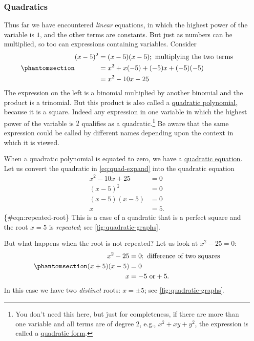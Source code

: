 \documentclass[
  a4paper,
]{article}
\begin{document}
\subsubsection{Quadratics}\label{quadratics}

Thus far we have encountered \emph{linear} equations, in which the
highest power of the variable is \(1\), and the other terms are
constants. But just as numbers can be multiplied, so too can expressions
containing variables. Consider
\begin{equation}\phantomsection\label{eq:quad-expand}{
\begin{aligned}
(x - 5)^{2} &= (x - 5)(x - 5); \text{ multiplying the two terms}\\
&= x^2 +x(-5) + (-5)x + (-5)(-5)\\
&= x^2 - 10x + 25
\end{aligned}
}\end{equation} The expression on the left is a binomial multiplied by
another binomial and the product is a trinomial. But this product is
also called a \href{https://en.wikipedia.org/wiki/Quadratic}{quadratic
polynomial}, because it is a square. Indeed any expression in one
variable in which the highest power of the variable is \(2\) qualifies
as a quadratic.\footnote{You don't need this here, but just for
  completeness, if there are more than one variable and all terms are of
  degree \(2\), e.g., \(x^2 + xy + y^2\), the expression is called a
  \href{https://en.wikipedia.org/wiki/Quadratic_form}{quadratic form}.}
Be aware that the same expression could be called by different names
depending upon the context in which it is viewed.

When a quadratic polynomial is equated to zero, we have a
\href{https://en.wikipedia.org/wiki/Quadratic_equation}{quadratic
equation}. Let us convert the quadratic in \cref{eq:quad-expand} into
the quadratic equation \[
\begin{aligned}
x^2 -10x + 25 &= 0\\
(x - 5)^2 &= 0\\
(x - 5)(x - 5) &= 0\\
x &= 5.
\end{aligned}
\] \{\#eqn:repeated-root\} This is a case of a quadratic that is a
perfect square and the root \(x = 5\) is \emph{repeated}; see
\cref{fig:quadratic-graphs}.

But what happens when the root is not repeated? Let us look at
\(x^2 - 25 = 0\):
\begin{equation}\phantomsection\label{eq:plus-minus-five}{
\begin{aligned}
x^2 - 25 &= 0; \text{ difference of two squares}\\
(x + 5)(x - 5) &= 0\\
x &= -5 \text{ or} +5.\\ 
\end{aligned}
}\end{equation} In this case we have two \emph{distinct} roots:
\(x = \pm5\); see \cref{fig:quadratic-graphs}.
\end{document}
